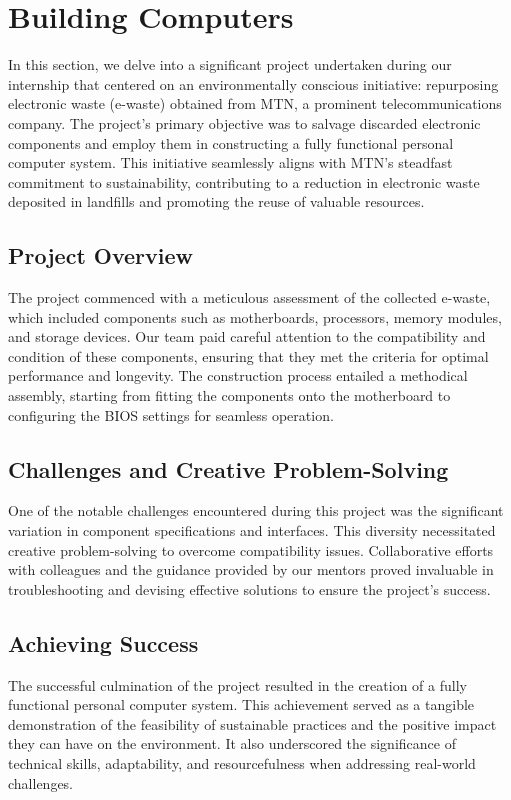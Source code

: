 \section{Building Computers}

In this section, we delve into a significant project undertaken during our internship that centered on an environmentally conscious initiative: repurposing electronic waste (e-waste) obtained from MTN, a prominent telecommunications company. The project's primary objective was to salvage discarded electronic components and employ them in constructing a fully functional personal computer system. This initiative seamlessly aligns with MTN's steadfast commitment to sustainability, contributing to a reduction in electronic waste deposited in landfills and promoting the reuse of valuable resources.

\subsection{Project Overview}

The project commenced with a meticulous assessment of the collected e-waste, which included components such as motherboards, processors, memory modules, and storage devices. Our team paid careful attention to the compatibility and condition of these components, ensuring that they met the criteria for optimal performance and longevity. The construction process entailed a methodical assembly, starting from fitting the components onto the motherboard to configuring the BIOS settings for seamless operation.

\subsection{Challenges and Creative Problem-Solving}

One of the notable challenges encountered during this project was the significant variation in component specifications and interfaces. This diversity necessitated creative problem-solving to overcome compatibility issues. Collaborative efforts with colleagues and the guidance provided by our mentors proved invaluable in troubleshooting and devising effective solutions to ensure the project's success.

\subsection{Achieving Success}

The successful culmination of the project resulted in the creation of a fully functional personal computer system. This achievement served as a tangible demonstration of the feasibility of sustainable practices and the positive impact they can have on the environment. It also underscored the significance of technical skills, adaptability, and resourcefulness when addressing real-world challenges.

